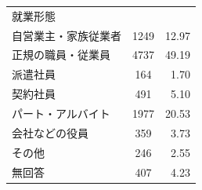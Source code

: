 \documentclass[a4paper,12pt, uplatex]{jsbook}
\begin{document}
\begin{table}[h]
\begin{tabular}{lcr}
        就業形態 & & \\
        \hspace{1em} 自営業主・家族従業者 & 1249 & 12.97 \\
        \hspace{1em} 正規の職員・従業員 & 4737	& 49.19 \\
        \hspace{1em} 派遣社員 & 164	& 1.70 \\
        \hspace{1em} 契約社員 & 491	& 5.10 \\
        \hspace{1em} パート・アルバイト & 1977	& 20.53 \\
        \hspace{1em} 会社などの役員 & 359 & 3.73 \\
        \hspace{1em} その他 & 246 & 2.55 \\
        \hspace{1em} 無回答 & 407 & 4.23 \\

        \bottomrule
    \end{tabular}
    \label{tab:個人データ概要_職業}
\end{table}
\end{document}
